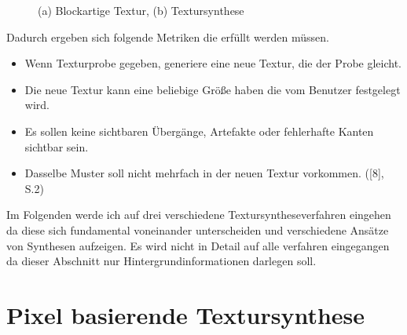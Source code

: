 \documentclass[12pt]{report}
\begin{document}
\begin{figure}[H]
    \centering
    \qquad
    \caption{(a) Blockartige Textur, (b) Textursynthese}%
\end{figure}

\noindent Dadurch ergeben sich folgende Metriken die erfüllt werden müssen.

\begin{itemize}
    \item Wenn Texturprobe gegeben, generiere eine neue Textur, die der Probe gleicht.
    \item Die neue Textur kann eine beliebige Größe haben die vom Benutzer festgelegt wird.
    \item Es sollen keine sichtbaren Übergänge, Artefakte oder fehlerhafte Kanten sichtbar sein.
    \item Dasselbe Muster soll nicht mehrfach in der neuen Textur vorkommen. {([8], S.2)}
\end{itemize}

Im Folgenden werde ich auf drei verschiedene Textursyntheseverfahren eingehen da diese sich fundamental voneinander unterscheiden und verschiedene Ansätze von Synthesen aufzeigen.
Es wird nicht in Detail auf alle verfahren eingegangen da dieser Abschnitt nur Hintergrundinformationen darlegen soll.

\section{Pixel basierende Textursynthese}
\end{document}
